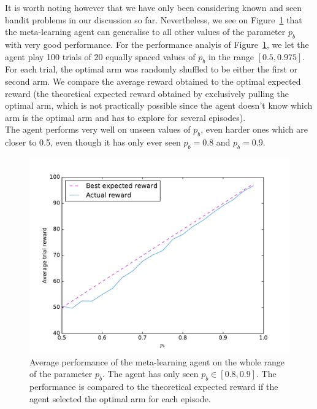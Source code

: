 It is worth noting however that we have only been considering known and seen
bandit problems in our discussion so far. Nevertheless, we see 
on Figure~\ref{fig:bandit_test} that the meta-learning agent can generalise to
all other values of the parameter $p_b$ with very good performance. For the 
performance analyis of Figure~\ref{fig:bandit_test}, we let the agent play 
100 trials of 20 equally spaced values of $p_b$ in the range $[0.5, 0.975]$.
For each trial, the optimal arm was randomly shuffled to be either the first
or second arm. We compare the average reward obtained to the optimal expected
reward (the theoretical expected reward obtained by exclusively pulling the
optimal arm, which is not practically possible since the agent doesn't know
which arm is the optimal arm and has to explore for several episodes).\\

The agent performs very well on unseen values of $p_b$, even harder ones which
are closer to 0.5, even though it has only ever seen $p_b = 0.8$ and $p_b = 0.9$.

\begin{figure}
	\centering
	\includegraphics[width=0.8\linewidth]{fig/bandit_test.pdf}
	\caption{Average performance of the meta-learning agent on the whole
	range of the parameter $p_b$. The agent has only seen
	$p_b \in [0.8, 0.9]$. The performance is compared to the theoretical
	expected reward if the agent selected the optimal arm for each episode.}
	\label{fig:bandit_test}
\end{figure}



